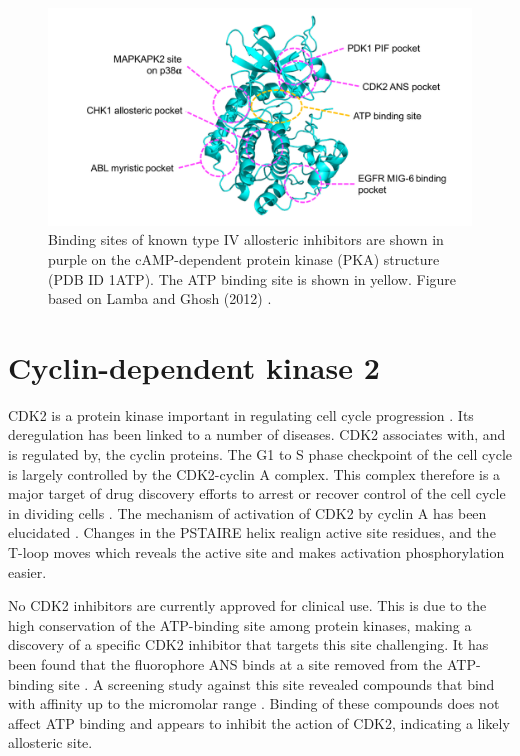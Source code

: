 \begin{figure}
\centering

\includegraphics[width=\textwidth]{figures/kinase_mods/kinase_mods}

\caption[Binding sites of known type IV allosteric inhibitors of protein kinases]
{Binding sites of known type IV allosteric inhibitors are shown in purple on the cAMP-dependent protein kinase (PKA) structure (PDB ID 1ATP).
The ATP binding site is shown in yellow.
Figure based on Lamba and Ghosh (2012) \cite{Lamba2012}.}

\label{fig:kinase_mods}
\end{figure}


\section{Cyclin-dependent kinase 2}
\label{sec:introduction_cdk2}

CDK2 is a protein kinase important in regulating cell cycle progression \cite{Peyressatre2015}.
Its deregulation has been linked to a number of diseases.
CDK2 associates with, and is regulated by, the cyclin proteins.
The G1 to S phase checkpoint of the cell cycle is largely controlled by the CDK2-cyclin A complex.
This complex therefore is a major target of drug discovery efforts to arrest or recover control of the cell cycle in dividing cells \cite{Betzi2011}.
The mechanism of activation of CDK2 by cyclin A has been elucidated \cite{Jeffrey1995}.
Changes in the PSTAIRE helix realign active site residues, and the T-loop moves which reveals the active site and makes activation phosphorylation easier.

No CDK2 inhibitors are currently approved for clinical use.
This is due to the high conservation of the ATP-binding site among protein kinases, making a discovery of a specific CDK2 inhibitor that targets this site challenging.
It has been found that the fluorophore ANS binds at a site removed from the ATP-binding site \cite{Betzi2011}.
A screening study against this site revealed compounds that bind with affinity up to the micromolar range \cite{Rastelli2014}.
Binding of these compounds does not affect ATP binding and appears to inhibit the action of CDK2, indicating a likely allosteric site.


